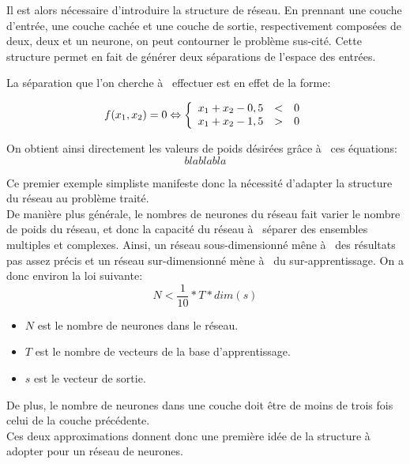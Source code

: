 \documentclass[a4paper,twoside]{report}
\begin{document}
Il est alors nécessaire d'introduire la structure de réseau. En prennant une couche d'entrée, une couche cachée et une couche de sortie, respectivement composées de deux, deux et un neurone, on peut contourner le problème sus-cité. Cette structure permet en fait de générer deux séparations de l'espace des entrées.

La séparation que l'on cherche à  effectuer est en effet de la forme:

\begin{equation}
f(x_{1},x_{2})=0 \Leftrightarrow
\left\{
\begin{array}{r c l}
x_{1}+x_{2}-0,5 &<& 0\\
x_{1}+x_{2}-1,5 &>& 0
\end{array}
\right.
\end{equation}

On obtient ainsi directement les valeurs de poids désirées grâce à  ces équations:
\begin{equation}
blablabla
\end{equation}

Ce premier exemple simpliste manifeste donc la nécessité d'adapter la structure du réseau au problème traité.\\

De manière plus générale, le nombres de neurones du réseau fait varier le nombre de poids du réseau, et donc la capacité du réseau à  séparer des ensembles multiples et complexes. Ainsi, un réseau sous-dimensionné mêne à  des résultats pas assez précis et un réseau sur-dimensionné mène à  du sur-apprentissage. On a donc environ la loi suivante:
\begin{equation}
N<\frac{1}{10}*T*dim(s)
\end{equation}
\begin{itemize}
  \item $N$ est le nombre de neurones dans le réseau.
  \item $T$ est le nombre de vecteurs de la base d'apprentissage.
  \item $s$ est le vecteur de sortie.
\end{itemize}

De plus, le nombre de neurones dans une couche doit être de moins de trois fois celui de la couche précédente.\\

Ces deux approximations donnent donc une première idée de la structure à  adopter pour un réseau de neurones.
\end{document}
